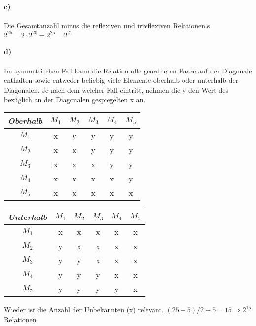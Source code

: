\documentclass[titlepage]{article}
\theoremstyle{plain}
\newcommand{\1}{\mathbb{1}}
\newcommand{\0}{\mathbb{0}}
\begin{document}
		\paragraph{c)} Die Gesamtanzahl minus die reflexiven und irreflexiven Relationen.s
		$2^{25}-2\cdot2^{20}=2^{25}-2^{21}$
		\paragraph{d)} Im symmetrischen Fall kann die Relation alle geordneten Paare auf der Diagonale enthalten sowie entweder beliebig viele Elemente oberhalb oder unterhalb der Diagonalen. Je nach dem welcher Fall eintritt, nehmen die y den Wert des bezüglich an der Diagonalen gespiegelten x an. 
		\begin{table}[h]
			\begin{tabular}{c|ccccc}
				\textit{Oberhalb}&$M_1$&$M_2$&$M_3$&$M_4$&$M_5$\\\hline
				$M_1$&x&y&y&y&y\\
				$M_2$&x&x&y&y&y\\
				$M_3$&x&x&x&y&y\\
				$M_4$&x&x&x&x&y\\
				$M_5$&x&x&x&x&x
			\end{tabular}
			\begin{tabular}{c|ccccc}
				\textit{Unterhalb}&$M_1$&$M_2$&$M_3$&$M_4$&$M_5$\\\hline
				$M_1$&x&x&x&x&x\\
				$M_2$&y&x&x&x&x\\
				$M_3$&y&y&x&x&x\\
				$M_4$&y&y&y&x&x\\
				$M_5$&y&y&y&y&x
			\end{tabular}
		\end{table}
		
		Wieder ist die Anzahl der Unbekannten (x) relevant. $(25-5)/2+5=15\Rightarrow2^{15}$ Relationen.
	
\end{document}
